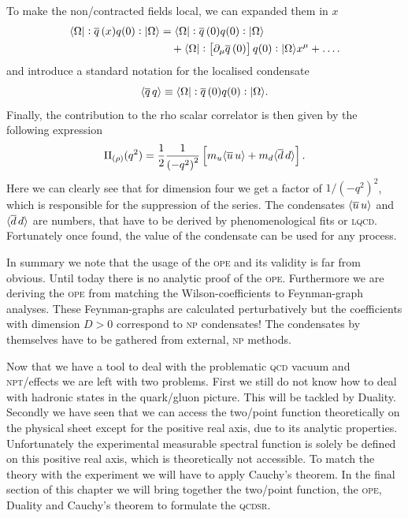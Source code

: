 \documentclass[../../index.tex]{subfiles}
\begin{document}
To make the non\-/contracted fields local, we can expanded them in $x$
\begin{equation}
  \begin{split}
    \langle \Omega \vert: \overline{q}\,(x) q(0):\vert \Omega \rangle &= \langle\Omega\vert: \overline{q}\,(0) q(0): \vert\Omega\rangle\\
    &\quad+ \langle\Omega\vert:\left[ \partial_\mu \overline{q}\,(0) \right]
    q(0):\vert\Omega\rangle x^\mu + \dots.
  \end{split}
\end{equation}
and introduce a standard notation for the localised condensate
\begin{equation}
  \langle \overline{q}\,q \rangle \equiv \langle\Omega\vert: \overline{q}\,(0) q(0):\vert\Omega\rangle.
\end{equation}
Finally, the contribution to the rho scalar correlator is then given by the
following expression
\begin{equation}
  \Pi_{(\rho)}(q^2) = \frac{1}{2} \frac{1}{\left(-q^2\right)^2} \left[ m_u\langle \overline{u}\, u \rangle + m_d \langle \overline{d}\, d \rangle\right].
\end{equation}
Here we can clearly see that for dimension four we get a factor of
\(1/(-q^2)^2\), which is responsible for the suppression of the series. The
condensates \(\langle\overline{u}\,u\rangle\) and \(\langle\overline{d}\,d\rangle\) are
numbers, that have to be derived by phenomenological fits or \textsc{lqcd}.
Fortunately once found, the value of the condensate can be used for any process.

In summary we note that the usage of the \textsc{ope} and its validity is far
from obvious. Until today there is no analytic proof of the \textsc{ope}.
Furthermore we are deriving the \textsc{ope} from matching the
Wilson-coefficients to Feynman-graph analyses. These Feynman-graphs are
calculated perturbatively but the coefficients with dimension $D>0$ correspond
to \textsc{np} condensates! The condensates by themselves have to be gathered
from external, \textsc{np} methods.

Now that we have a tool to deal with the problematic \textsc{qcd} vacuum and
\textsc{npt}\-/effects we are left with two problems. First we still do not know
how to deal with hadronic states in the quark\-/gluon picture. This will be
tackled by Duality. Secondly we have seen that we can access the two\-/point
function theoretically on the physical sheet except for the positive real axis,
due to its analytic properties. Unfortunately the experimental measurable
spectral function is solely be defined on this positive real axis, which is
theoretically not accessible. To match the theory with the experiment we will
have to apply Cauchy's theorem. In the final section of this chapter we will
bring together the two\-/point function, the \textsc{ope}, Duality and Cauchy's
theorem to formulate the \textsc{qcdsr}.
\end{document}
